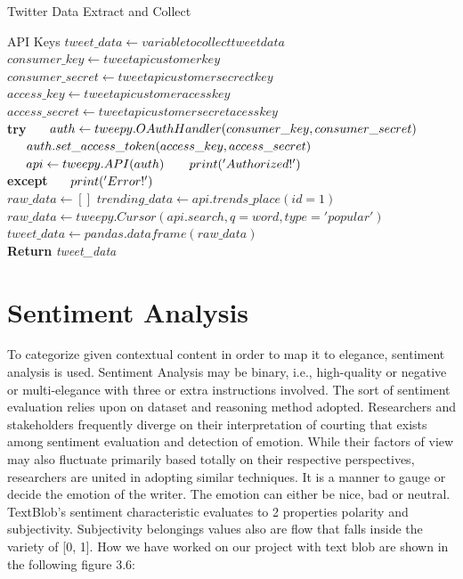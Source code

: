 \begin{algorithm}[H]
\caption{Twitter Data Extract and Collect}\label{alg:tweet}
\begin{algorithmic}[1]
\Require API Keys
\State $tweet\_data \gets variable to collect tweet data$
\State $consumer\_key \gets tweet api customer key$
\State $consumer\_secret \gets tweet api customer secrect key$
\State $access\_key \gets tweet api customer acess key$
\State $access\_secret \gets tweet api customer secret acess key$
\\\textbf{try}
    \State $\indent auth \gets tweepy.OAuthHandler(consumer\_key, consumer\_secret)$
    \State $\indent auth.set\_access\_token(access\_key, access\_secret)$
    \State $\indent api \gets tweepy.API(auth)$
    \State $\indent print('Authorized!')$
\\\textbf{except}
    \State $\indent print('Error!')$\\
    
\State $raw\_data \gets []$
\State $trending\_data \gets api.trends\_place(id=1)$
        \State $raw\_data \gets tweepy.Cursor(api.search,q=word,type='popular')$
    \EndFor
\EndFor
\State $tweet\_data \gets pandas.dataframe(raw\_data)$
\\\textbf{Return}
\textit{tweet\_data}
\end{algorithmic}
\end{algorithm}


\section{Sentiment Analysis}
To categorize given contextual content in order to map it to elegance, sentiment analysis is used. Sentiment Analysis may be binary, i.e., high-quality or negative or multi-elegance with three or extra instructions involved. The sort of sentiment evaluation relies upon on dataset and reasoning method adopted. Researchers and stakeholders frequently diverge on their interpretation of courting that exists among sentiment evaluation and detection of emotion. While their factors of view may also fluctuate primarily based totally on their respective perspectives, researchers are united in adopting similar techniques. It is a manner to gauge or decide the emotion of the writer. The emotion can either be nice, bad or neutral. TextBlob’s sentiment characteristic evaluates to 2 properties polarity and subjectivity. Subjectivity belongings values also are flow that falls inside the variety of [0, 1]. How we have worked on our project with text blob are shown in the following figure 3.6:\\

